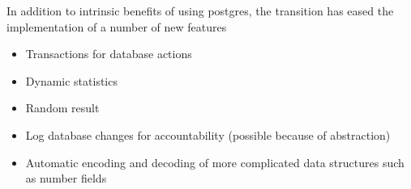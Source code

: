 \documentclass{article}
\begin{document}
In addition to intrinsic benefits of using postgres, the transition has eased the implementation of a number of new features
\begin{itemize}
\item Transactions for database actions
\item Dynamic statistics
\item Random result
\item Log database changes for accountability (possible because of abstraction)
\item Automatic encoding and decoding of more complicated data structures such as number fields
\end{itemize}
\end{document}
